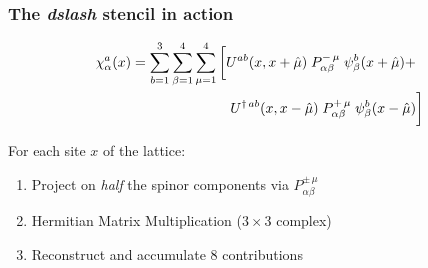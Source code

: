 \documentclass{beamer}
\begin{document}
  \begin{frame}
    \frametitle{The \textit{dslash} stencil in action}

    \begin{align*}
      \nonumber
      \chi^a_\alpha(x)
      &= \sum_{b = 1}^3 \sum_{\beta = 1}^4 \sum_{\mu=1}^4
      \bigg[
        U^{ab}(x,x+\hat\mu) \; P^{-\, \mu}_{\alpha\beta} \; \psi^b_\beta(x+\hat\mu) + \\
        \nonumber
        &\hspace{25.0mm}
        U^{\dagger\, ab}(x,x-\hat\mu) \; P^{+\,\mu}_{\alpha\beta} \; \psi^b_\beta(x-\hat\mu)
      \bigg]
    \end{align*}

    \vfill
    For each site $x$ of the lattice:
    \vfill
    \begin{enumerate}
      \item Project on \textit{half} the spinor components via $P^{\pm\,\mu}_{\alpha\beta}$
      \item Hermitian Matrix Multiplication ($3 \times 3$ complex)
      \item Reconstruct and accumulate 8 contributions
    \end{enumerate}

  \end{frame}

\end{document}
